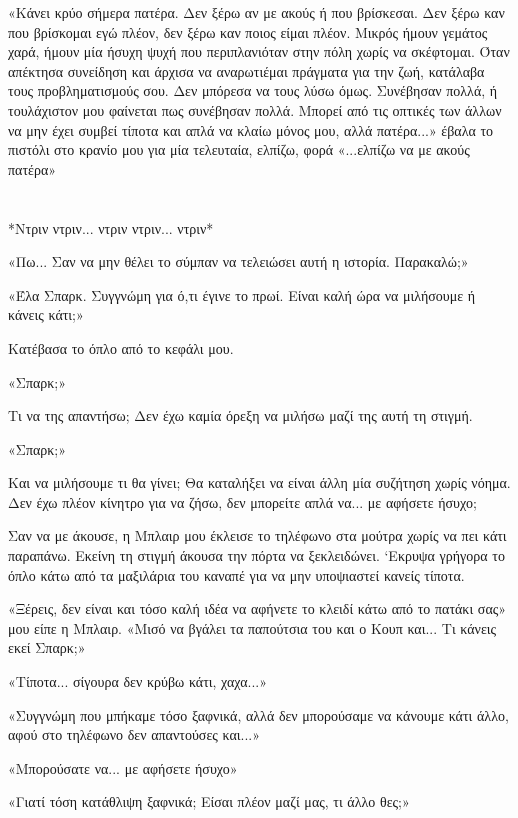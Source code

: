 \documentclass[12pt,twoside, openany]{book}
\begin{document}
«Κάνει κρύο σήμερα πατέρα. Δεν ξέρω αν με ακούς ή που βρίσκεσαι. Δεν ξέρω καν που βρίσκομαι εγώ πλέον, δεν ξέρω καν ποιος είμαι πλέον. Μικρός ήμουν γεμάτος χαρά, ήμουν μία ήσυχη ψυχή που περιπλανιόταν στην πόλη χωρίς να σκέφτομαι. Όταν απέκτησα συνείδηση και άρχισα να αναρωτιέμαι πράγματα για την ζωή, κατάλαβα τους προβληματισμούς σου. Δεν μπόρεσα να τους λύσω όμως. Συνέβησαν πολλά, ή τουλάχιστον μου φαίνεται πως συνέβησαν πολλά. Μπορεί από τις οπτικές των άλλων να μην έχει συμβεί τίποτα και απλά να κλαίω μόνος μου, αλλά πατέρα...» έβαλα το πιστόλι στο κρανίο μου για μία τελευταία, ελπίζω, φορά «...ελπίζω να με ακούς πατέρα»

\chapter{}

*Ντριν ντριν... ντριν ντριν... ντριν*

«Πω... Σαν να μην θέλει το σύμπαν να τελειώσει αυτή η ιστορία. Παρακαλώ;»

«Έλα Σπαρκ. Συγγνώμη για ό,τι έγινε το πρωί. Είναι καλή ώρα να μιλήσουμε ή κάνεις κάτι;»

Κατέβασα το όπλο από το κεφάλι μου.

«Σπαρκ;»

Τι να της απαντήσω; Δεν έχω καμία όρεξη να μιλήσω μαζί της αυτή τη στιγμή.

«Σπαρκ;»

Και να μιλήσουμε τι θα γίνει; Θα καταλήξει να είναι άλλη μία συζήτηση χωρίς νόημα. Δεν έχω πλέον κίνητρο για να ζήσω, δεν μπορείτε απλά να... με αφήσετε ήσυχο;

Σαν να με άκουσε, η Μπλαιρ μου έκλεισε το τηλέφωνο στα μούτρα χωρίς να πει κάτι παραπάνω. Εκείνη τη στιγμή άκουσα την πόρτα να ξεκλειδώνει. ‘Εκρυψα γρήγορα το όπλο κάτω από τα μαξιλάρια του καναπέ για να μην υποψιαστεί κανείς τίποτα.

«Ξέρεις, δεν είναι και τόσο καλή ιδέα να αφήνετε το κλειδί κάτω από το πατάκι σας» μου είπε η Μπλαιρ. «Μισό να βγάλει τα παπούτσια του και ο Κουπ και... Τι κάνεις εκεί Σπαρκ;»

«Τίποτα... σίγουρα δεν κρύβω κάτι, χαχα...»

«Συγγνώμη που μπήκαμε τόσο ξαφνικά, αλλά δεν μπορούσαμε να κάνουμε κάτι άλλο, αφού στο τηλέφωνο δεν απαντούσες και...»

«Μπορούσατε να... με αφήσετε ήσυχο»

«Γιατί τόση κατάθλιψη ξαφνικά; Είσαι πλέον μαζί μας, τι άλλο θες;»
\end{document}
